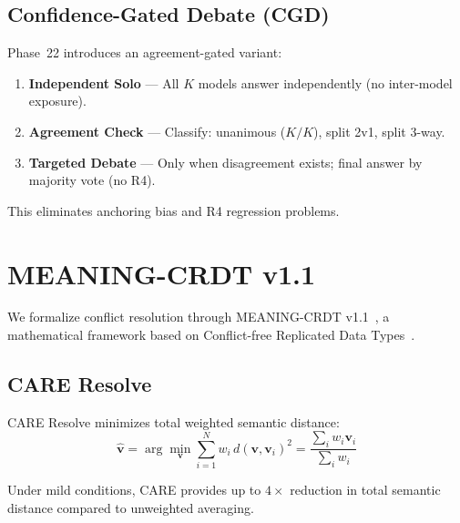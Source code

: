 \documentclass[11pt,a4paper]{article}
\begin{document}
\subsection{Confidence-Gated Debate (CGD)}

Phase~22 introduces an agreement-gated variant:

\begin{resultbox}
\begin{enumerate}
  \item \textbf{Independent Solo} — All $K$ models answer
    independently (no inter-model exposure).
  \item \textbf{Agreement Check} — Classify: unanimous ($K/K$),
    split 2v1, split 3-way.
  \item \textbf{Targeted Debate} — Only when disagreement exists;
    final answer by majority vote (no R4).
\end{enumerate}
\end{resultbox}

This eliminates anchoring bias and R4 regression problems.

\section{MEANING-CRDT v1.1}\label{sec:crdt}

\noindent
We formalize conflict resolution through MEANING-CRDT
v1.1~\cite{kelevra2026crdt}, a mathematical framework based on
Conflict-free Replicated Data Types~\cite{shapiro2011crdt}.

\subsection{CARE Resolve}

\begin{theorembox}
CARE Resolve minimizes total weighted semantic distance:
\[
  \hat{\mathbf{v}} = \arg\min_{\mathbf{v}}
    \sum_{i=1}^{N} w_i \, d(\mathbf{v}, \mathbf{v}_i)^2
    = \frac{\sum_{i} w_i \mathbf{v}_i}{\sum_{i} w_i}
\]
\end{theorembox}

\begin{theorembox}
Under mild conditions, CARE provides up to $4\times$ reduction in
total semantic distance compared to unweighted averaging.
\end{theorembox}
\end{document}
